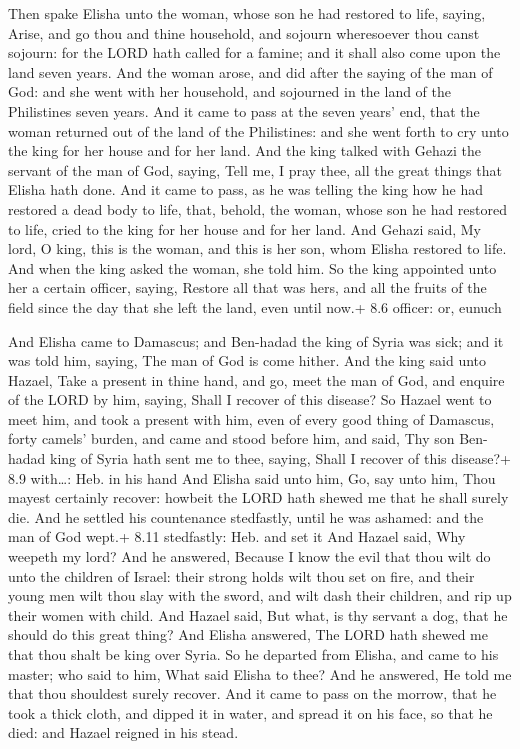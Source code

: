  Then spake Elisha unto the woman, whose son he had restored
to life, saying, Arise, and go thou and thine household, and sojourn
wheresoever thou canst sojourn: for the LORD hath called for a famine;
and it shall also come upon the land seven years.  And the
woman arose, and did after the saying of the man of God: and she went
with her household, and sojourned in the land of the Philistines seven
years.  And it came to pass at the seven years' end, that
the woman returned out of the land of the Philistines: and she went
forth to cry unto the king for her house and for her land. 
And the king talked with Gehazi the servant of the man of God, saying,
Tell me, I pray thee, all the great things that Elisha hath done.
 And it came to pass, as he was telling the king how he had
restored a dead body to life, that, behold, the woman, whose son he had
restored to life, cried to the king for her house and for her land. And
Gehazi said, My lord, O king, this is the woman, and this is her son,
whom Elisha restored to life.  And when the king asked the
woman, she told him. So the king appointed unto her a certain officer,
saying, Restore all that was hers, and all the fruits of the field since
the day that she left the land, even until now.+ 8.6 officer: or, eunuch

 And Elisha came to Damascus; and Ben-hadad the king of
Syria was sick; and it was told him, saying, The man of God is come
hither.  And the king said unto Hazael, Take a present in
thine hand, and go, meet the man of God, and enquire of the LORD by him,
saying, Shall I recover of this disease?  So Hazael went to
meet him, and took a present with him, even of every good thing of
Damascus, forty camels' burden, and came and stood before him, and said,
Thy son Ben-hadad king of Syria hath sent me to thee, saying, Shall I
recover of this disease?+ 8.9 with\ldots: Heb. in his hand 
And Elisha said unto him, Go, say unto him, Thou mayest certainly
recover: howbeit the LORD hath shewed me that he shall surely die.
 And he settled his countenance stedfastly, until he was
ashamed: and the man of God wept.+ 8.11 stedfastly: Heb. and set it
 And Hazael said, Why weepeth my lord? And he answered,
Because I know the evil that thou wilt do unto the children of Israel:
their strong holds wilt thou set on fire, and their young men wilt thou
slay with the sword, and wilt dash their children, and rip up their
women with child.  And Hazael said, But what, is thy
servant a dog, that he should do this great thing? And Elisha answered,
The LORD hath shewed me that thou shalt be king over Syria.
 So he departed from Elisha, and came to his master; who
said to him, What said Elisha to thee? And he answered, He told me that
thou shouldest surely recover.  And it came to pass on the
morrow, that he took a thick cloth, and dipped it in water, and spread
it on his face, so that he died: and Hazael reigned in his stead.


